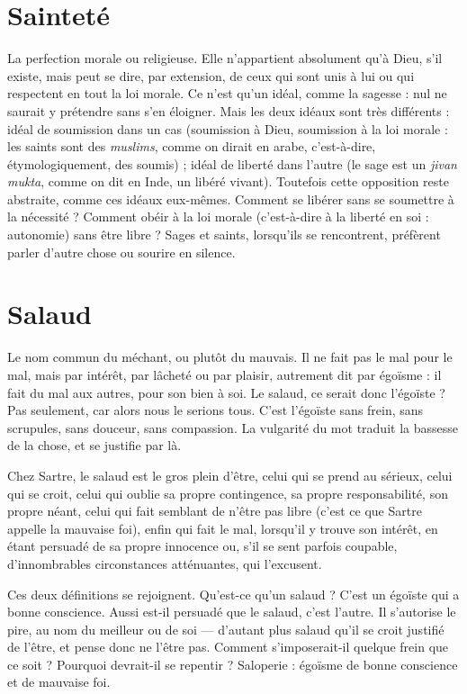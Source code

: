 \section{Sainteté}
La perfection morale ou religieuse. Elle n'appartient absolument
qu'à Dieu, s’il existe, mais peut se dire, par extension, de
ceux qui sont unis à lui ou qui respectent en tout la loi morale. Ce n’est qu’un
idéal, comme la sagesse : nul ne saurait y prétendre sans s’en éloigner. Mais les
deux idéaux sont très différents : idéal de soumission dans un cas (soumission à
Dieu, soumission à la loi morale : les saints sont des {\it muslims}, comme on dirait
en arabe, c’est-à-dire, étymologiquement, des soumis) ; idéal de liberté dans
l’autre (le sage est un {\it jivan mukta}, comme on dit en Inde, un libéré vivant).
Toutefois cette opposition reste abstraite, comme ces idéaux eux-mêmes. Comment
se libérer sans se soumettre à la nécessité ? Comment obéir à la loi morale
(c’est-à-dire à la liberté en soi : autonomie) sans être libre ? Sages et saints,
lorsqu'ils se rencontrent, préfèrent parler d’autre chose ou sourire en silence.

\section{Salaud}
Le nom commun du méchant, ou plutôt du mauvais. Il ne fait pas
le mal pour le mal, mais par intérêt, par lâcheté ou par plaisir,
autrement dit par égoïsme : il fait du mal aux autres, pour son bien à soi. Le
salaud, ce serait donc l’égoïste ? Pas seulement, car alors nous le serions tous.
C’est l’égoïste sans frein, sans scrupules, sans douceur, sans compassion. La vulgarité
du mot traduit la bassesse de la chose, et se justifie par là.

Chez Sartre, le salaud est le gros plein d’être, celui qui se prend au sérieux,
celui qui se croit, celui qui oublie sa propre contingence, sa propre responsabilité,
son propre néant, celui qui fait semblant de n’être pas libre (c’est ce que
Sartre appelle la mauvaise foi), enfin qui fait le mal, lorsqu'il y trouve son
intérêt, en étant persuadé de sa propre innocence ou, s’il se sent parfois coupable,
d’innombrables circonstances atténuantes, qui l’excusent.

Ces deux définitions se rejoignent. Qu'est-ce qu’un salaud ? C’est un égoïste
qui a bonne conscience. Aussi est-il persuadé que le salaud, c’est l’autre. Il
s’autorise le pire, au nom du meilleur ou de soi — d’autant plus salaud qu’il se
croit justifié de l’être, et pense donc ne l'être pas. Comment s’imposerait-il
quelque frein que ce soit ? Pourquoi devrait-il se repentir ? Saloperie : égoïsme
de bonne conscience et de mauvaise foi.

